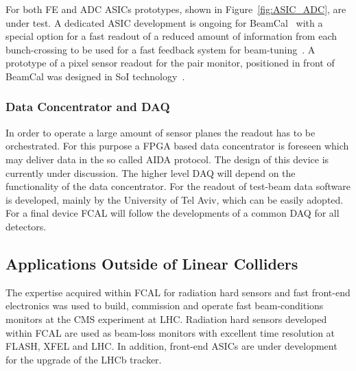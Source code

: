 For both FE and ADC ASICs prototypes, shown in Figure~\ref{fig:ASIC_ADC}, are under test.
A dedicated ASIC development is ongoing for BeamCal~\cite{6200898}
with a special option for a fast readout of a reduced amount of
information from each bunch-crossing to be used for a fast feedback system for beam-tuning~\cite{1748-0221-3-10-P10004}.
A prototype of a pixel sensor readout for the pair monitor, positioned in front of BeamCal was designed in SoI
technology~\cite{Sato201153}.


\subsubsection{Data Concentrator and DAQ}
In order to operate a large amount of sensor planes the readout has to be orchestrated.
For this purpose a FPGA based data concentrator is foreseen
which may deliver data in the so called AIDA protocol. The design of this device is currently under discussion.
The higher level DAQ will depend on the functionality of the data concentrator.
For the readout of test-beam data  software is developed, mainly by the University of Tel Aviv,
which can be easily adopted.
For a final device FCAL will follow the developments of a common DAQ for all detectors.



\subsection{Applications Outside of Linear Colliders}
The expertise acquired within FCAL for radiation hard sensors and fast front-end electronics was
used to build, commission and operate fast
beam-conditions monitors at the CMS experiment at LHC.
Radiation hard sensors developed within FCAL are used as beam-loss monitors
with excellent time resolution at FLASH, XFEL and LHC.
In addition, front-end ASICs are under development for the upgrade of the LHCb tracker.
